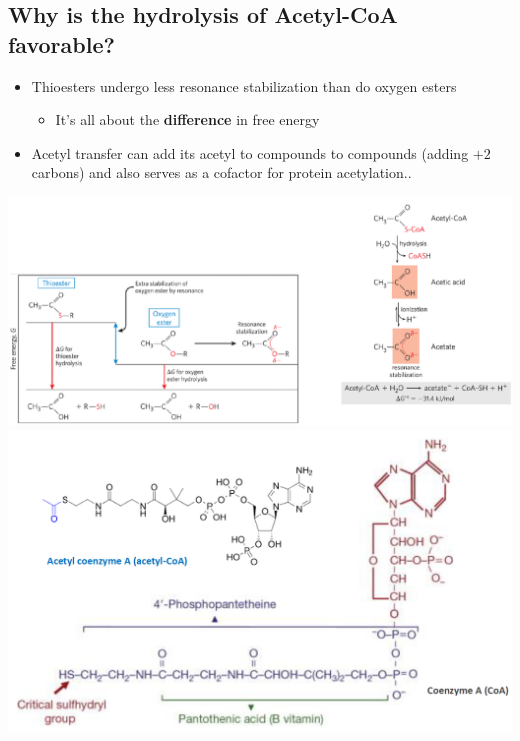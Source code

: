 \documentclass[10pt]{article}
\begin{document}
\subsection*{Why is the hydrolysis of Acetyl-CoA favorable?}
\begin{itemize}
	\item Thioesters undergo less resonance stabilization than do oxygen esters
	\begin{itemize}
        \item It's all about the \textbf{difference} in free energy
    \end{itemize}
    \item Acetyl transfer can add its acetyl to compounds to compounds (adding $+2$ carbons) and also serves as a cofactor for protein acetylation..
\end{itemize}
\begin{center} 
	\includegraphics*[width=\textwidth]{L2_13.png}\\
    \includegraphics*[width=\textwidth]{L2_14.png}
\end{center}
\end{document}
